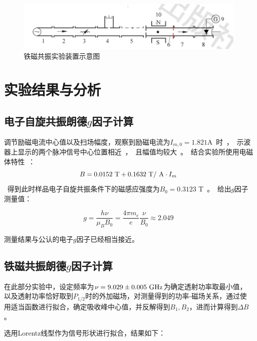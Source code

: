 \documentclass{thuemp}
\begin{document}
    \begin{figure}[H]
        \centering
        \includegraphics[width=0.8\linewidth]{./FMR-apparatus.png}
        \caption{铁磁共振实验装置示意图} \label{fig:FMR-apparatus}
    \end{figure}
    
    \section{实验结果与分析}
    
    \subsection{电子自旋共振朗德$g$因子计算}
    
    调节励磁电流中心值以及扫场幅度，观察到励磁电流为$I_{m,0} = 1.821$\si\ampere 时，示波器上显示的两个脉冲信号中心位置相近，且幅值均较大。结合实验所使用电磁体特性：
    
    \begin{equation}
        B = 0.0152 ~\text{\si\tesla} + 0.1632 ~\text{\si\tesla / \si\ampere} \cdot I_m
    \end{equation}
    
    得到此时样品电子自旋共振条件下的磁感应强度为$B_0 = 0.3123$ \si\tesla。给出$g$因子测量值：
    
    \begin{equation}
    g = \frac{h \nu}{\mu_B B_0} = \frac{4\pi m_e}{e} \frac{\nu}{B_0}\approx 2.049
    \end{equation}
    
    测量结果与公认的电子$g$因子已经相当接近。
    
    \subsection{铁磁共振朗德$g$因子计算}
    
    在此部分实验中，设定频率为$\nu = 9.029 \pm 0.005~\text{\si{\giga \hertz}}$为确定透射功率取最小值，以及透射功率恰好取到$P_{1/2}$时的外加磁场，对测量得到的功率-磁场关系，通过使用适当函数进行拟合，确定吸收峰中心值，并反解得到$B_1, B_2$，进而计算得到$\Delta B$。
    
    选用Lorentz线型作为信号形状进行拟合，结果如下：
    
\end{document}
